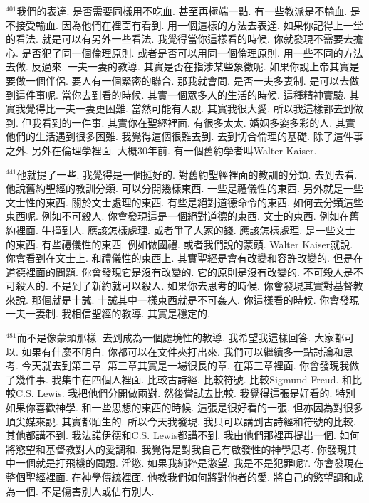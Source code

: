 \documentclass{book}
\begin{document}
$^{401}$我們的表達.
是否需要同樣用不吃血.
甚至再極端一點.
有一些教派是不輸血.
是不接受輸血.
因為他們在裡面有看到.
用一個這樣的方法去表達.
如果你記得上一堂的看法.
就是可以有另外一些看法.
我覺得當你這樣看的時候.
你就發現不需要去擔心.
是否犯了同一個倫理原則.
或者是否可以用同一個倫理原則.
用一些不同的方法去做.
反過來.
一夫一妻的教導.
其實是否在指涉某些象徵呢.
如果你說上帝其實是要做一個伴侶.
要人有一個緊密的聯合.
那我就會問.
是否一夫多妻制.
是可以去做到這件事呢.
當你去到看的時候.
其實一個眾多人的生活的時候.
這種精神實驗.
其實我覺得比一夫一妻更困難.
當然可能有人說.
其實我很大愛.
所以我這樣都去到做到.
但我看到的一件事.
其實你在聖經裡面.
有很多太太.
婚姻多姿多彩的人.
其實他們的生活遇到很多困難.
我覺得這個很難去到.
去到切合倫理的基礎.
除了這件事之外.
另外在倫理學裡面.
大概30年前.
有一個舊約學者叫Walter Kaiser.

$^{441}$他就提了一些.
我覺得是一個挺好的.
對舊約聖經裡面的教訓的分類.
去到去看.
他說舊約聖經的教訓分類.
可以分開幾樣東西.
一些是禮儀性的東西.
另外就是一些文士性的東西.
關於文士處理的東西.
有些是絕對道德命令的東西.
如何去分類這些東西呢.
例如不可殺人.
你會發現這是一個絕對道德的東西.
文士的東西.
例如在舊約裡面.
牛撞到人.
應該怎樣處理.
或者爭了人家的錢.
應該怎樣處理.
是一些文士的東西.
有些禮儀性的東西.
例如做國禮.
或者我們說的蒙頭.
Walter Kaiser就說.
你會看到在文士上.
和禮儀性的東西上.
其實聖經是會有改變和容許改變的.
但是在道德裡面的問題.
你會發現它是沒有改變的.
它的原則是沒有改變的.
不可殺人是不可殺人的.
不是到了新約就可以殺人.
如果你去思考的時候.
你會發現其實對基督教來說.
那個就是十誡.
十誡其中一樣東西就是不可姦人.
你這樣看的時候.
你會發現一夫一妻制.
我相信聖經的教導.
其實是穩定的.

$^{481}$而不是像蒙頭那樣.
去到成為一個處境性的教導.
我希望我這樣回答.
大家都可以.
如果有什麼不明白.
你都可以在文件夾打出來.
我們可以繼續多一點討論和思考.
今天就去到第三章.
第三章其實是一場很長的章.
在第三章裡面.
你會發現我做了幾件事.
我集中在四個人裡面.
比較古詩經.
比較符號.
比較Sigmund Freud.
和比較C.S. Lewis.
我把他們分開做兩對.
然後嘗試去比較.
我覺得這張是好看的.
特別如果你喜歡神學.
和一些思想的東西的時候.
這張是很好看的一張.
但亦因為對很多頂尖媒來說.
其實都陌生的.
所以今天我發現.
我只可以講到古詩經和符號的比較.
其他都講不到.
我法諾伊德和C.S. Lewis都講不到.
我由他們那裡再提出一個.
如何將慾望和基督教對人的愛調和.
我覺得是對我自己有啟發性的神學思考.
你發現其中一個就是打飛機的問題.
淫慾.
如果我純粹是慾望.
我是不是犯罪呢?.
你會發現在整個聖經裡面.
在神學傳統裡面.
他教我們如何將對他者的愛.
將自己的慾望調和成為一個.
不是傷害別人或佔有別人.
\end{document}
